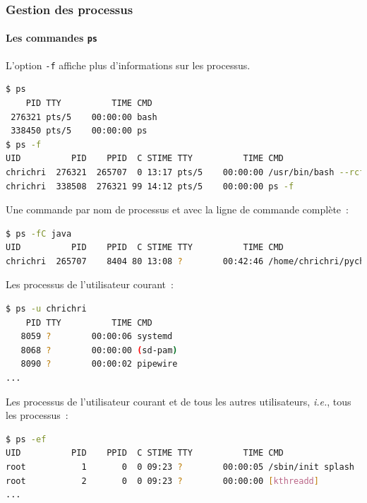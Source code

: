\documentclass{beamer}
\begin{document}
    \begin{frame}[fragile]
        \transdissolve
        \frametitle{Gestion des processus}
        \framesubtitle{Les commandes \lstinline{ps}}
        L'option \lstinline{-f} affiche plus d'informations sur les processus.
        \begin{lstlisting}[language=bash,basicstyle=\tiny\ttfamily]
$ ps
    PID TTY          TIME CMD
 276321 pts/5    00:00:00 bash
 338450 pts/5    00:00:00 ps
$ ps -f
UID          PID    PPID  C STIME TTY          TIME CMD
chrichri  276321  265707  0 13:17 pts/5    00:00:00 /usr/bin/bash --rcfile /home/chrichri/pycharm-professional-2024.1.4/pycharm-2024.1.4/plugins/terminal/shell-integrations/bash/bash-integration.bash -i
chrichri  338508  276321 99 14:12 pts/5    00:00:00 ps -f
        \end{lstlisting}
        Une commande par nom de processus et avec la ligne de commande complète~:
        \begin{lstlisting}[language=bash,basicstyle=\tiny\ttfamily]
$ ps -fC java
UID          PID    PPID  C STIME TTY          TIME CMD
chrichri  265707    8404 80 13:08 ?        00:42:46 /home/chrichri/pycharm...
        \end{lstlisting}
        \bigbreak
        Les processus de l'utilisateur courant~:
        \begin{lstlisting}[language=bash,basicstyle=\tiny\ttfamily]
$ ps -u chrichri
    PID TTY          TIME CMD
   8059 ?        00:00:06 systemd
   8068 ?        00:00:00 (sd-pam)
   8090 ?        00:00:02 pipewire
...
        \end{lstlisting}
        \bigbreak
        Les processus de l'utilisateur courant et de tous les autres utilisateurs, \textit{i.e.}, tous les processus~:
        \begin{lstlisting}[language=bash,basicstyle=\tiny\ttfamily]
$ ps -ef
UID          PID    PPID  C STIME TTY          TIME CMD
root           1       0  0 09:23 ?        00:00:05 /sbin/init splash
root           2       0  0 09:23 ?        00:00:00 [kthreadd]
...
        \end{lstlisting}
    \end{frame}
\end{document}
